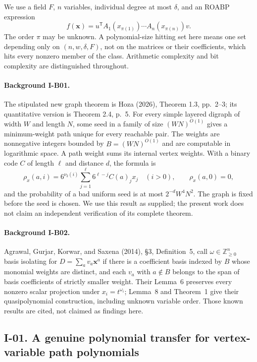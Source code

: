\documentclass[11pt,a4paper]{article}
\theoremstyle{definition}\newtheorem{definition}{Definition}
\begin{document}
We use a field $F$, $n$ variables, individual degree at most $\delta$, and
an ROABP expression
\[
 f(\mathbf x)=u^{\mathsf T}A_1(x_{\pi(1)})\cdots A_n(x_{\pi(n)})v.
\]
The order $\pi$ may be unknown.  A polynomial-size hitting set here means
one set depending only on $(n,w,\delta,F)$, not on the matrices or their
coefficients, which hits every nonzero member of the class.  Arithmetic
complexity and bit complexity are distinguished throughout.

\paragraph{Background I-B01.}
The stipulated new graph theorem is Hoza (2026), Theorem 1.3, pp.~2--3;
its quantitative version is Theorem 2.4, p.~5.  For every simple layered
digraph of width $W$ and length $N$, some seed in a family of size
$(WN)^{O(1)}$ gives a minimum-weight path unique for every reachable pair.
The weights are nonnegative integers bounded by $B=(WN)^{O(1)}$ and are
computable in logarithmic space.  A path weight sums its internal vertex
weights.  With a binary code $C$ of length $\ell$ and distance $d$, the
formula is
\[
 \rho_x(a,i)=6^{\nu_2(i)}\sum_{j=1}^{\ell}6^{\ell-j}C(a)_j x_j
 \quad(i>0),\qquad \rho_x(a,0)=0,
\tag{I.1}\label{eq:I-hoza}
\]
and the probability of a bad uniform seed is at most
$2^{-d}W^4N^2$.  The graph is fixed before the seed is chosen.
We use this result as supplied; the present work does not claim an
independent verification of its complete theorem.

\paragraph{Background I-B02.}
Agrawal, Gurjar, Korwar, and Saxena (2014), \S3, Definition~5, call
$\omega\in\mathbb Z_{\geq0}^{n}$ basis isolating for
$D=\sum_a v_a\mathbf x^a$ if there is a coefficient basis indexed by $B$
whose monomial weights are distinct, and each $v_a$ with $a\notin B$
belongs to the span of basis coefficients of strictly smaller weight.
Their Lemma~6 preserves every nonzero scalar projection under
$x_i=t^{\omega_i}$; Lemma~8 and Theorem~1 give their quasipolynomial
construction, including unknown variable order.  Those known results
are cited, not claimed as findings here.

\subsection{I-01. A genuine polynomial transfer for vertex-variable path polynomials}
\label{I-01}
\end{document}
